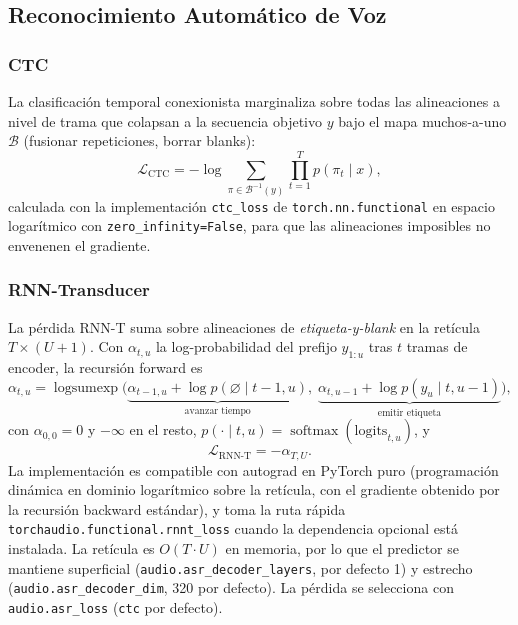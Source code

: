 \subsection{Reconocimiento Automático de Voz}

\subsubsection{CTC}

La clasificación temporal conexionista \citep{Graves2006ctc} marginaliza sobre todas las alineaciones a nivel de trama que colapsan a la secuencia objetivo $y$ bajo el mapa muchos-a-uno $\mathcal{B}$ (fusionar repeticiones, borrar blanks):
\begin{equation}
\mathcal{L}_{\text{CTC}} = -\log \sum_{\pi \in \mathcal{B}^{-1}(y)} \prod_{t=1}^{T} p(\pi_t \mid x),
\label{eq:audio-ctc}
\end{equation}
calculada con la implementación \texttt{ctc\_loss} de \texttt{torch.nn.functional} en espacio logarítmico con \texttt{zero\_infinity=False}, para que las alineaciones imposibles no envenenen el gradiente.

\subsubsection{RNN-Transducer}

La pérdida RNN-T \citep{Graves2012} suma sobre alineaciones de \emph{etiqueta-y-blank} en la retícula $T \times (U+1)$. Con $\alpha_{t,u}$ la log-probabilidad del prefijo $y_{1:u}$ tras $t$ tramas de encoder, la recursión forward es
\begin{equation}
\alpha_{t,u} = \operatorname{logsumexp}\Big(
\underbrace{\alpha_{t-1,u} + \log p(\varnothing \mid t-1, u)}_{\text{avanzar tiempo}},
\;
\underbrace{\alpha_{t,u-1} + \log p(y_u \mid t, u-1)}_{\text{emitir etiqueta}}
\Big),
\label{eq:audio-rnnt}
\end{equation}
con $\alpha_{0,0} = 0$ y $-\infty$ en el resto, $p(\cdot \mid t,u) = \operatorname{softmax}(\mathrm{logits}_{t,u})$, y
\begin{equation}
\mathcal{L}_{\text{RNN-T}} = -\alpha_{T,U}.
\label{eq:audio-rnnt-loss}
\end{equation} La implementación es compatible con autograd en PyTorch puro (programación dinámica en dominio logarítmico sobre la retícula, con el gradiente obtenido por la recursión backward estándar), y toma la ruta rápida \texttt{torchaudio.functional.rnnt\_loss} cuando la dependencia opcional está instalada. La retícula es $O(T \cdot U)$ en memoria, por lo que el predictor se mantiene superficial (\texttt{audio.asr\_decoder\_layers}, por defecto 1) y estrecho (\texttt{audio.asr\_decoder\_dim}, 320 por defecto). La pérdida se selecciona con \texttt{audio.asr\_loss} (\texttt{ctc} por defecto).

